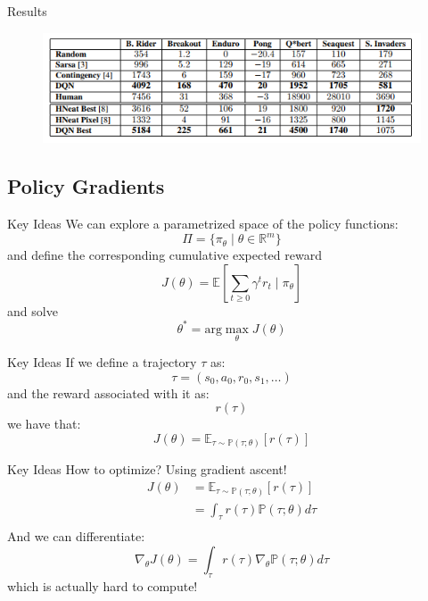 \documentclass{beamer}
\begin{document}
	\begin{frame}{Results}
		\begin{figure}
			\centering
			\includegraphics[width=1.2\textheight]{dqn_results.png}
		\end{figure}
	\end{frame}
	
	
	\subsection*{Policy Gradients}
	
	\begin{frame}
		\begin{block}{Key Ideas}
			We can explore a parametrized space of the policy functions:
			$$ \Pi = \{ \pi_\theta \mid \theta \in \mathbb{R}^m \} $$
			and define the corresponding cumulative expected reward
			$$ J(\theta) = \mathbb{E} \left[ \sum_{t\geq0}\gamma^t r_t  \mid \pi_\theta \right] $$
			and solve
			$$ \theta^* = \text{arg} \max_\theta J(\theta) $$
		\end{block}
	\end{frame}
	
	\begin{frame}
		\begin{block}{Key Ideas}
			If we define a trajectory $ \tau $ as:
			$$ \tau = \left( s_0,a_0,r_0,s_1,\ldots \right) $$
			and the reward associated with it as:
			$$ r(\tau) $$
			we have that:
			$$ J(\theta) = \mathbb{E}_{\tau \sim \mathbb{P}(\tau ; \theta) } \left[ r(\tau) \right] $$
		\end{block}
	\end{frame}
	
	\begin{frame}
		\begin{block}{Key Ideas}
			How to optimize? Using gradient ascent!
			\begin{align*}
			J(\theta) &= \mathbb{E}_{\tau \sim \mathbb{P}(\tau ; \theta) } \left[ r(\tau) \right]\\
			&= \int_{\tau} r(\tau) \mathbb{P}(\tau ; \theta) d\tau \\
			\end{align*}
			And we can differentiate:
			$$ \nabla_\theta J(\theta) = \int_{\tau} r(\tau) \nabla_\theta \mathbb{P}(\tau ; \theta) d\tau $$
			which is actually hard to compute!
		\end{block}
	\end{frame}
	
\end{document}
